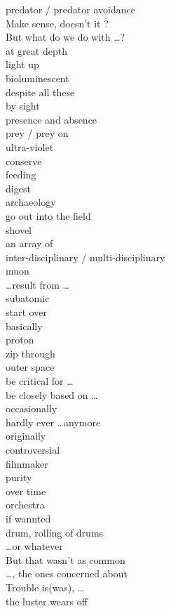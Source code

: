 \documentclass[12pt]{article}
\begin{document}
predator / predator avoidance \\
Make sense, doesn't it ? \\
But what do we do with \dots ? \\
at great depth \\
light up \\
bioluminescent \\
despite all these \\
by sight \\
presence and absence \\
prey / prey on \\
ultra-violet \\
conserve \\
feeding \\
digest \\
archaeology \\
go out into the field \\
shovel \\
an array of \\
inter-disciplinary / multi-disciplinary \\
muon \\
\dots result from \dots \\
subatomic \\
start over \\
basically \\
proton \\
zip through \\
outer space \\
be critical for \dots \\
be closely based on \dots \\
occasionally \\
hardly ever \dots anymore \\
originally \\
controversial \\
filmmaker \\
purity \\
over time \\
orchestra \\
if wannted \\
drum, rolling of drums \\
\dots or whatever \\
But that wasn't as common \\
\dots, the ones concerned about \\
Trouble is(was), \dots \\
the luster wears off \\
\end{document}
